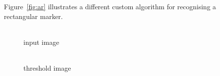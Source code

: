 \documentclass[12pt,a4paper,oneside,openright]{book}
\newcommand{\fig}[1]{Figure~\ref{fig:#1}}
\begin{document}
\begin{CJK}{UTF8}{}
\fig{ar} illustrates a different custom algorithm for recognising a rectangular marker.
\begin{figure}[htbp]
  \begin{center}
    \begin{minipage}[t]{.32\textwidth}
      \begin{center}
        \\
        input image
      \end{center}
    \end{minipage}
    \begin{minipage}[t]{.32\textwidth}
      \begin{center}
        \\
        threshold image
      \end{center}
    \end{minipage}
    \begin{minipage}[t]{.32\textwidth}
      \begin{center}
        \\

\end{center}
\end{minipage}
\end{center}
\end{figure}
\end{CJK}
\end{document}
